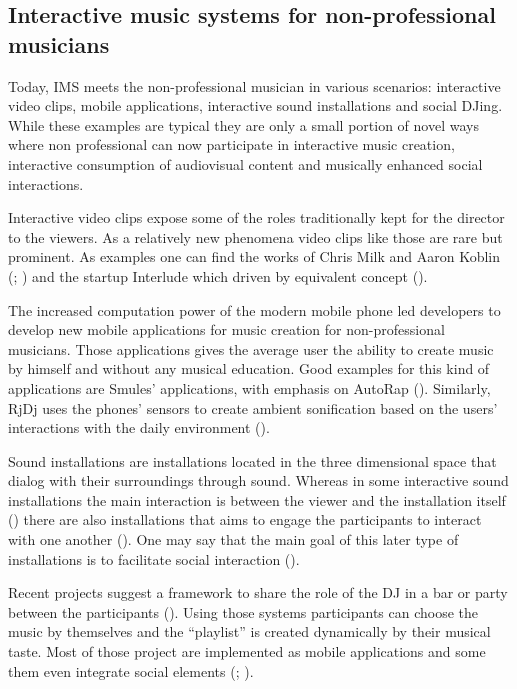 \documentclass[a4paper,11pt]{article}
\begin{document}
\subsection{Interactive music systems for non-professional musicians}

Today, IMS meets the non-professional musician in various scenarios: interactive video clips, mobile applications, interactive sound installations and social DJing.
While these examples are typical they are only a small portion of novel ways where non professional can now participate in interactive music creation, interactive consumption of audiovisual content and musically enhanced social interactions.

Interactive video clips expose some of the roles traditionally kept for the director to the viewers.
As a relatively new phenomena video clips like those are rare but prominent.
As examples one can find the works of Chris Milk and Aaron Koblin (\citeauthor{web:milk1}; \citeauthor{web:milk2}) and the startup Interlude which driven by equivalent concept (\citeauthor{web:interlude}).

The increased computation power of the modern mobile phone led developers to develop new mobile applications for music creation for non-professional musicians.
Those applications gives the average user the ability to create music by himself and without any musical education.
Good examples for this kind of applications are Smules' applications, with emphasis on AutoRap (\citeauthor{web:autorap}).
Similarly, RjDj uses the phones' sensors to create ambient sonification based on the users' interactions with the daily environment (\cite{web:rjdj})\label{rjdj}.

Sound installations are installations located in the three dimensional space that dialog with their surroundings through sound.
Whereas in some interactive sound installations the main interaction is between the viewer and the installation itself (\cite{web:visnjic}) there are also installations that aims to engage the participants to interact with one another (\cite{eng03}).
One may say that the main goal of this later type of installations is to facilitate social interaction ().

Recent projects suggest a framework to share the role of the DJ in a bar or party between the participants (\cite{web:shaw}).
Using those systems participants can choose the music by themselves and the ``playlist'' is created dynamically by their musical taste.
Most of those project are implemented as mobile applications and some them even integrate social elements (\citeauthor{web:playmysong}; \cite{web:lammers}).
\end{document}

